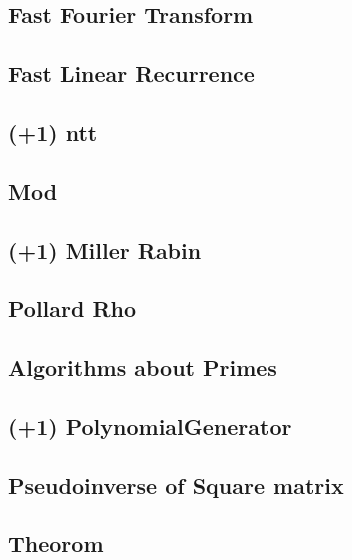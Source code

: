 \documentclass[10pt,twocolumn,oneside]{article}
\begin{document}
\subsection{Fast Fourier Transform}


\subsection{Fast Linear Recurrence}


\subsection{(+1) ntt}


\subsection{Mod}


\subsection{(+1) Miller Rabin}


\subsection{Pollard Rho}


\subsection{Algorithms about Primes}


\subsection{(+1) PolynomialGenerator}


\subsection{Pseudoinverse of Square matrix}


\subsection{Theorom}

\end{document}
